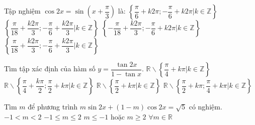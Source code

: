 \begin{ex}%
	Tập nghiệm  $\cos 2x = \sin \left( x + \dfrac{\pi}{3} \right)$ là:
	\choice
	{$\left\{\dfrac{\pi}{6}+k2\pi;-\dfrac{\pi}{6}+k2\pi|k\in\mathbb{Z} \right\} $}
	{$\left\{\dfrac{\pi}{18}+\dfrac{k2\pi}{3};-\dfrac{\pi}{6}+\dfrac{k2\pi}{3}|k\in\mathbb{Z} \right\} $}
	{\True $\left\{-\dfrac{\pi}{18}+\dfrac{k2\pi}{3};-\dfrac{\pi}{6}+k2\pi|k\in\mathbb{Z} \right\} $}
	{$\left\{\dfrac{\pi}{18}+\dfrac{k2\pi}{3};-\dfrac{\pi}{6}+\dfrac{k2\pi}{3}|k\in\mathbb{Z} \right\} $}
\end{ex}
\begin{ex}%
	Tìm tập xác định của hàm số $y = \dfrac{\tan 2x}{1 - \tan x}$.
	\choice
	{$ \mathbb{R}\backslash\left\{\dfrac{\pi}{4}+k\pi|k\in\mathbb{Z}\right\} $}
	{\True $ \mathbb{R}\backslash\left\{\dfrac{\pi}{4}+\dfrac{k\pi}{2};\dfrac{\pi}{2}+k\pi|k\in\mathbb{Z}\right\} $}
	{$ \mathbb{R}\backslash\left\{\dfrac{\pi}{2}+k\pi|k\in\mathbb{Z}\right\} $}
	{$ \mathbb{R}\backslash\left\{\dfrac{\pi}{2}+k\pi;\dfrac{\pi}{4}+k\pi|k\in\mathbb{Z}\right\} $}
\end{ex}
\begin{ex}%
	Tìm $m$ để phương trình $m\sin 2x + (1 - m)\cos 2x = \sqrt 5 $ có nghiệm.
	\choice
	{$ - 1 < m < 2$}
	{$ - 1 \le m \le 2$}
	{\True $m \le  - 1$ hoặc $m \ge 2$}
	{$ \forall m\in\mathbb{R} $}
\end{ex}
